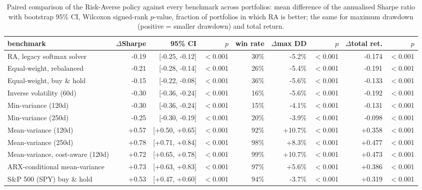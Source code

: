 \begin{table}[ht!]
\centering
\footnotesize
\setlength{\tabcolsep}{4pt}
\begin{tabular}{lrrrrrrrr}
\hline
benchmark & $\Delta$Sharpe & 95\% CI & $p$ & win rate & $\Delta$max DD & $p$ & $\Delta$total ret. & $p$ \\
\hline
RA, legacy softmax solver & -0.19 & [-0.25, -0.12] & $<$0.001 & 30\% & -5.2\% & $<$0.001 & -0.174 & $<$0.001 \\
Equal-weight, rebalanced & -0.21 & [-0.28, -0.14] & $<$0.001 & 26\% & -5.4\% & $<$0.001 & -0.191 & $<$0.001 \\
Equal-weight, buy \& hold & -0.15 & [-0.22, -0.08] & $<$0.001 & 36\% & -5.6\% & $<$0.001 & -0.133 & $<$0.001 \\
Inverse volatility (60d) & -0.30 & [-0.36, -0.24] & $<$0.001 & 16\% & -5.6\% & $<$0.001 & -0.192 & $<$0.001 \\
Min-variance (120d) & -0.30 & [-0.36, -0.24] & $<$0.001 & 15\% & -4.1\% & $<$0.001 & -0.131 & $<$0.001 \\
Min-variance (250d) & -0.25 & [-0.30, -0.19] & $<$0.001 & 20\% & -3.9\% & $<$0.001 & -0.098 & $<$0.001 \\
Mean-variance (120d) & +0.57 & [+0.50, +0.65] & $<$0.001 & 92\% & +10.7\% & $<$0.001 & +0.358 & $<$0.001 \\
Mean-variance (250d) & +0.78 & [+0.71, +0.84] & $<$0.001 & 98\% & +8.3\% & $<$0.001 & +0.477 & $<$0.001 \\
Mean-variance, cost-aware (120d) & +0.72 & [+0.65, +0.78] & $<$0.001 & 99\% & +10.7\% & $<$0.001 & +0.473 & $<$0.001 \\
ARX-conditional mean-variance & +0.73 & [+0.63, +0.83] & $<$0.001 & 97\% & +5.6\% & $<$0.001 & +0.386 & $<$0.001 \\
S\&P 500 (SPY) buy \& hold & +0.53 & [+0.47, +0.60] & $<$0.001 & 94\% & -3.7\% & $<$0.001 & +0.319 & $<$0.001 \\
\hline
\end{tabular}
\caption{Paired comparison of the Risk-Averse policy against every benchmark across portfolios: mean difference of the annualised Sharpe ratio with bootstrap 95\% CI, Wilcoxon signed-rank $p$-value, fraction of portfolios in which RA is better; the same for maximum drawdown (positive = smaller drawdown) and total return.}
\label{tab:bench_paired_bear2022}
\end{table}
